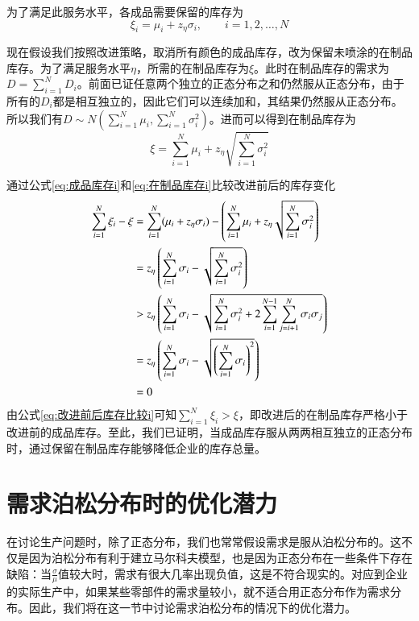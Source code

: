 为了满足此服务水平，各成品需要保留的库存为
\begin{equation}
\xi_i = \mu_i + z_\eta\sigma_i,\qquad i=1,2,\ldots,N
\label{eq:成品库存i}
\end{equation}

现在假设我们按照改进策略，取消所有颜色的成品库存，改为保留未喷涂的在制品库存。为了满足服务水平$\eta$，所需的在制品库存为$\xi$。此时在制品库存的需求为$D=\sum_{i=1}^ND_i$。前面已证任意两个独立的正态分布之和仍然服从正态分布，由于所有的$D_i$都是相互独立的，因此它们可以连续加和，其结果仍然服从正态分布。所以我们有$D\sim N(\sum_{i=1}^N\mu_i,\sum_{i=1}^N\sigma_i^2)$。进而可以得到在制品库存为
\begin{equation}
\xi = \sum_{i=1}^N\mu_i + z_\eta\sqrt{\sum_{i=1}^N\sigma_i^2}
\label{eq:在制品库存i}
\end{equation}

通过公式\ref{eq:成品库存i}和\ref{eq:在制品库存i}比较改进前后的库存变化
\begin{align}
\sum_{i=1}^N\xi_i - \xi &= \sum_{i=1}^N (\mu_i+z_\eta\sigma_i) - \left(\sum_{i=1}^N\mu_i + z_\eta\sqrt{\sum_{i=1}^N\sigma_i^2}\right) \notag\\
&= z_\eta\left(\sum_{i=1}^N\sigma_i-\sqrt{\sum_{i=1}^N\sigma_i^2}\right) \notag\\
&> z_\eta\left(\sum_{i=1}^N\sigma_i-\sqrt{\sum_{i=1}^N\sigma_i^2+2\sum_{i=1}^{N-1}\sum_{j=i+1}^N\sigma_i\sigma_j}\right) \notag\\
&= z_\eta\left(\sum_{i=1}^N\sigma_i-\sqrt{\left(\sum_{i=1}^N\sigma_i\right)^2}\right) \notag\\
&= 0
\label{eq:改进前后库存比较i}
\end{align}
由公式\ref{eq:改进前后库存比较i}可知$\sum_{i=1}^N\xi_i > \xi$，即改进后的在制品库存严格小于改进前的成品库存。至此，我们已证明，当成品库存服从两两相互独立的正态分布时，通过保留在制品库存能够降低企业的库存总量。









\section{需求泊松分布时的优化潜力}

在讨论生产问题时，除了正态分布，我们也常常假设需求是服从泊松分布的。这不仅是因为泊松分布有利于建立马尔科夫模型，也是因为正态分布在一些条件下存在缺陷：当$\frac{\sigma}{\mu}$值较大时，需求有很大几率出现负值，这是不符合现实的。对应到企业的实际生产中，如果某些零部件的需求量较小，就不适合用正态分布作为需求分布。因此，我们将在这一节中讨论需求泊松分布的情况下的优化潜力。




